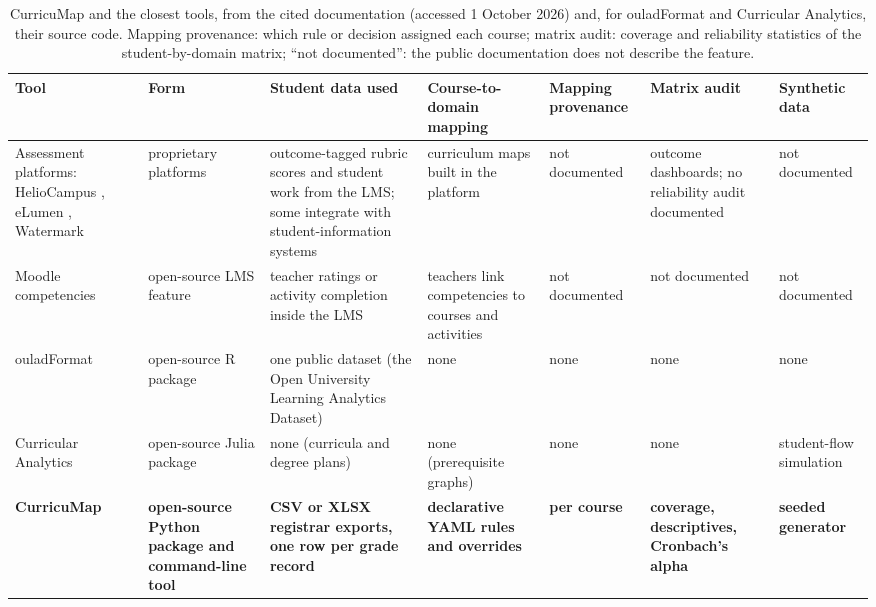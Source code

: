 \documentclass[preprint,12pt,a4paper]{elsarticle}
\begin{document}
\begin{table}[!tbp]
\centering\scriptsize
\setlength{\tabcolsep}{2pt}
\renewcommand{\arraystretch}{1.1}
\begin{tabularx}{\linewidth}{@{}L{2.2cm}YYYYYY@{}}
\toprule
Tool & Form & Student data used & Course-to-domain mapping & Mapping provenance & Matrix audit & Synthetic data \\
\midrule
Assessment platforms: HelioCampus \cite{heliocampus}, eLumen \cite{elumen}, Watermark \cite{watermark} & proprietary platforms & outcome-tagged rubric scores and student work from the LMS; some integrate with student-information systems & curriculum maps built in the platform & not documented & outcome dashboards; no reliability audit documented & not documented \\[2pt]
Moodle competencies \cite{moodlecompetencies} & open-source LMS feature & teacher ratings or activity completion inside the LMS & teachers link competencies to courses and activities & not documented & not documented & not documented \\[2pt]
ouladFormat \cite{howard2025} & open-source R package & one public dataset (the Open University Learning Analytics Dataset) & none & none & none & none \\[2pt]
Curricular Analytics \cite{heileman2018,curricularanalyticsjl} & open-source Julia package & none (curricula and degree plans) & none (prerequisite graphs) & none & none & student-flow simulation \\[2pt]
\textbf{CurricuMap} & \textbf{open-source Python package and command-line tool} & \textbf{CSV or XLSX registrar exports, one row per grade record} & \textbf{declarative YAML rules and overrides} & \textbf{per course} & \textbf{coverage, descriptives, Cronbach's alpha} & \textbf{seeded generator} \\
\bottomrule
\end{tabularx}
\caption{CurricuMap and the closest tools, from the cited documentation (accessed 1 October 2026) and, for ouladFormat and Curricular Analytics, their source code. Mapping provenance: which rule or decision assigned each course; matrix audit: coverage and reliability statistics of the student-by-domain matrix; ``not documented'': the public documentation does not describe the feature.}
\label{tab:compare}
\end{table}
\end{document}
